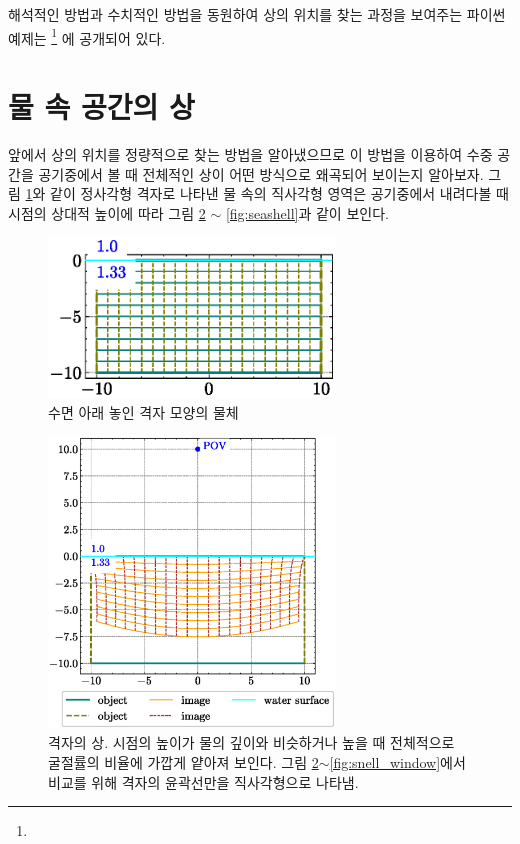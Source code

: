 \documentclass[twocolumn]{article}
\begin{document}
해석적인 방법과 수치적인 방법을 동원하여 상의 위치를 찾는 과정을 보여주는 파이썬 예제는  
\href{https://github.com/mingshey/python_projects/blob/main/Refraction_Image.ipynb}%
{}\footnote{} 에 공개되어 있다.

\section{물 속 공간의 상}
앞에서 상의 위치를 정량적으로 찾는 방법을 알아냈으므로 이 방법을 이용하여 
수중 공간을 공기중에서 볼 때 전체적인 상이 어떤 방식으로 왜곡되어 보이는지  알아보자. 
그림 \ref{fig:grid_underwater}와 같이 정사각형 격자로 나타낸 물 속의 직사각형 영역은 공기중에서 내려다볼 때
시점의 상대적 높이에 따라 그림 \ref{fig:image_underwater} $\sim$ \ref{fig:seashell}과 같이 보인다.

\begin{figure}
	\centering
	\includegraphics[width=3in]{figs/grid_underwater.eps}
	\caption{수면 아래 놓인 격자 모양의 물체}
	\label{fig:grid_underwater}
\end{figure}

\begin{figure}
	\centering
	\includegraphics[width=3in]{figs/image_underwater1.eps}
	\caption{격자의 상. 시점의 높이가 물의 깊이와 비슷하거나 높을 때 전체적으로 굴절률의 비율에 가깝게 얕아져 보인다. 그림 \ref{fig:image_underwater}$\sim$\ref{fig:snell_window}에서 비교를 위해 격자의 윤곽선만을 직사각형으로 나타냄. }
	\label{fig:image_underwater}
\end{figure}
\end{document}
